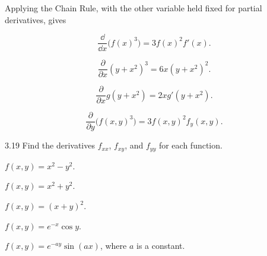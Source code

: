 \documentclass[11pt,oneside]{article}
\begin{document}
\begin{solution}
Applying the Chain Rule, with the other variable held fixed for partial derivatives, gives
\begin{problemsubparts}
    \item
    \[
        \boxed{\frac{\dd}{\dd x}\bigl(f(x)^3\bigr)=3f(x)^2f'(x)}.
    \]

    \item
    \[
        \boxed{\frac{\partial}{\partial x}(y+x^2)^3=6x(y+x^2)^2}.
    \]

    \item
    \[
        \boxed{\frac{\partial}{\partial x}g(y+x^2)=2xg'(y+x^2)}.
    \]

    \item
    \[
        \boxed{\frac{\partial}{\partial y}\bigl(f(x,y)^3\bigr)=3f(x,y)^2f_y(x,y)}.
    \]
\end{problemsubparts}
\end{solution}

\begin{problem}{3.19}
Find the derivatives $f_{xx}$, $f_{xy}$, and $f_{yy}$ for each function.
\begin{problemsubparts}
    \item $f(x,y)=x^2-y^2$.
    \item $f(x,y)=x^2+y^2$.
    \item $f(x,y)=(x+y)^2$.
    \item $f(x,y)=e^{-x}\cos y$.
    \item $f(x,y)=e^{-ay}\sin(ax)$, where $a$ is a constant.
\end{problemsubparts}
\end{problem}
\end{document}
